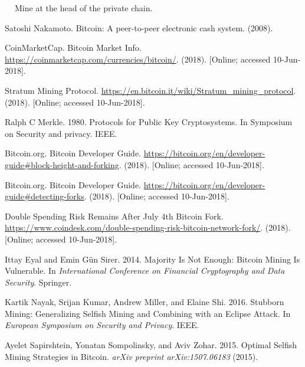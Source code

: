 \documentclass[a4paper, 11pt]{article}
\begin{document}
\begin{CJK*}{UTF8}{gbsn}
\begin{algorithm}
            $\ \ \ \ $ Mine at the head of the private chain.

    \end{algorithm}



    \clearpage

    \begin{thebibliography}{8}

    Satoshi Nakamoto. Bitcoin: A peer-to-peer electronic cash system. (2008).

    CoinMarketCap. Bitcoin Market Info. 
    \url{https://coinmarketcap.com/currencies/bitcoin/}. 
    (2018). [Online; accessed 10-Jun-2018].


    Stratum Mining Protocol. 
    \url{https://en.bitcoin.it/wiki/Stratum_mining_protocol}.
    (2018). [Online; accessed 10-Jun-2018].
    
    
    Ralph C Merkle. 1980. Protocols for Public Key Cryptosystems. In Symposium on
    Security and privacy. IEEE.

    Bitcoin.org. Bitcoin Developer Guide. 
    \url{https://bitcoin.org/en/developer-guide#block-height-and-forking}.
    (2018). [Online; accessed 10-Jun-2018].


    Bitcoin.org. Bitcoin Developer Guide. 
    \url{https://bitcoin.org/en/developer-guide#detecting-forks}.
    (2018). [Online; accessed 10-Jun-2018].

    Double Spending Risk Remains After July 4th Bitcoin Fork.
    \url{https://www.coindesk.com/double-spending-risk-bitcoin-network-fork/}. 
    (2018). [Online; accessed 10-Jun-2018].

    Ittay Eyal and Emin Gün Sirer. 2014. Majority Is Not Enough: Bitcoin Mining
    Is Vulnerable. 
    In \textit{International Conference on Financial Cryptography and Data
    Security}. Springer.

    Kartik Nayak, Srijan Kumar, Andrew Miller, and Elaine Shi. 2016. Stubborn
    Mining: Generalizing Selfish Mining and Combining with an Eclipse Attack. 
    In \textit{European Symposium on Security and Privacy}. IEEE.

    Ayelet Sapirshtein, Yonatan Sompolinsky, and Aviv Zohar. 2015. Optimal Selfish
    Mining Strategies in Bitcoin.
    \textit{arXiv preprint arXiv:1507.06183} (2015).


\end{thebibliography}
\end{CJK*}
\end{document}
